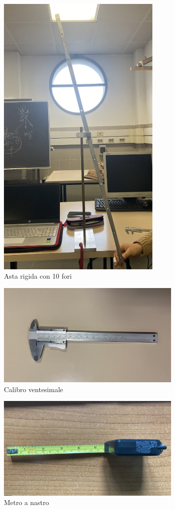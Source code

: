 \documentclass{article}
\begin{document}
\begin{figure} [H]
    \centering
    \includegraphics[width=8cm]{sbarra_forata.jpg}
    \caption{Asta rigida con 10 fori}
    \label{fig:my_label}
\end{figure}

\FloatBarrier

\begin{figure}
    \centering
    \includegraphics[width=9cm]{calibro.jpg}
    \caption{Calibro ventesimale}
    \label{fig:my_label}
\end{figure}

\begin{figure}
    \centering
    \includegraphics[width=9cm]{metro.jpg}
    \caption{Metro a nastro}
    \label{fig:my_label}
\end{figure}
\end{document}

